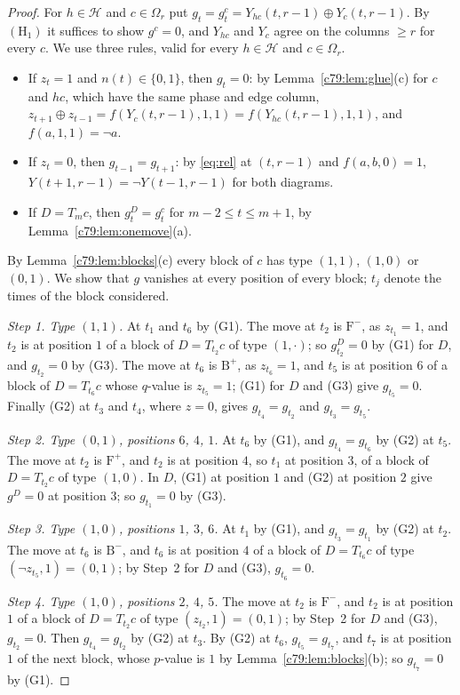 \begin{proof}
For $h\in\mathcal H$ and $c\in\Omega_r$ put $g_t=g^c_t=Y_{hc}(t,r-1)\oplus Y_c(t,r-1)$. By $(\mathrm H_1)$ it suffices to show $g^c=0$, and $Y_{hc}$ and $Y_c$ agree on the columns $\ge r$ for every $c$. We use three rules, valid for every $h\in\mathcal H$ and $c\in\Omega_r$.
\begin{itemize}
\item[(G1)] If $z_t=1$ and $n(t)\in\{0,1\}$, then $g_t=0$: by Lemma~\ref{c79:lem:glue}(c) for $c$ and $hc$, which have the same phase and edge column, $z_{t+1}\oplus z_{t-1}=f(Y_c(t,r-1),1,1)=f(Y_{hc}(t,r-1),1,1)$, and $f(a,1,1)=\neg a$.
\item[(G2)] If $z_t=0$, then $g_{t-1}=g_{t+1}$: by \eqref{eq:rel} at $(t,r-1)$ and $f(a,b,0)=1$, $Y(t+1,r-1)=\neg Y(t-1,r-1)$ for both diagrams.
\item[(G3)] If $D=T_mc$, then $g^D_t=g^c_t$ for $m-2\le t\le m+1$, by Lemma~\ref{c79:lem:onemove}(a).
\end{itemize}
By Lemma~\ref{c79:lem:blocks}(c) every block of $c$ has type $(1,1)$, $(1,0)$ or $(0,1)$. We show that $g$ vanishes at every position of every block; $t_j$ denote the times of the block considered.

\emph{Step 1. Type $(1,1)$.} At $t_1$ and $t_6$ by (G1). The move at $t_2$ is $\mathrm F^-$, as $z_{t_1}=1$, and $t_2$ is at position $1$ of a block of $D=T_{t_2}c$ of type $(1,\cdot)$; so $g^D_{t_2}=0$ by (G1) for $D$, and $g_{t_2}=0$ by (G3). The move at $t_6$ is $\mathrm B^+$, as $z_{t_6}=1$, and $t_5$ is at position $6$ of a block of $D=T_{t_6}c$ whose $q$-value is $z_{t_5}=1$; (G1) for $D$ and (G3) give $g_{t_5}=0$. Finally (G2) at $t_3$ and $t_4$, where $z=0$, gives $g_{t_4}=g_{t_2}$ and $g_{t_3}=g_{t_5}$.

\emph{Step 2. Type $(0,1)$, positions $6$, $4$, $1$.} At $t_6$ by (G1), and $g_{t_4}=g_{t_6}$ by (G2) at $t_5$. The move at $t_2$ is $\mathrm F^+$, and $t_2$ is at position $4$, so $t_1$ at position $3$, of a block of $D=T_{t_2}c$ of type $(1,0)$. In $D$, (G1) at position $1$ and (G2) at position $2$ give $g^D=0$ at position $3$; so $g_{t_1}=0$ by (G3).

\emph{Step 3. Type $(1,0)$, positions $1$, $3$, $6$.} At $t_1$ by (G1), and $g_{t_3}=g_{t_1}$ by (G2) at $t_2$. The move at $t_6$ is $\mathrm B^-$, and $t_6$ is at position $4$ of a block of $D=T_{t_6}c$ of type $(\neg z_{t_5},1)=(0,1)$; by Step~2 for $D$ and (G3), $g_{t_6}=0$.

\emph{Step 4. Type $(1,0)$, positions $2$, $4$, $5$.} The move at $t_2$ is $\mathrm F^-$, and $t_2$ is at position $1$ of a block of $D=T_{t_2}c$ of type $(z_{t_2},1)=(0,1)$; by Step~2 for $D$ and (G3), $g_{t_2}=0$. Then $g_{t_4}=g_{t_2}$ by (G2) at $t_3$. By (G2) at $t_6$, $g_{t_5}=g_{t_7}$, and $t_7$ is at position $1$ of the next block, whose $p$-value is $1$ by Lemma~\ref{c79:lem:blocks}(b); so $g_{t_7}=0$ by (G1).


\end{proof}
